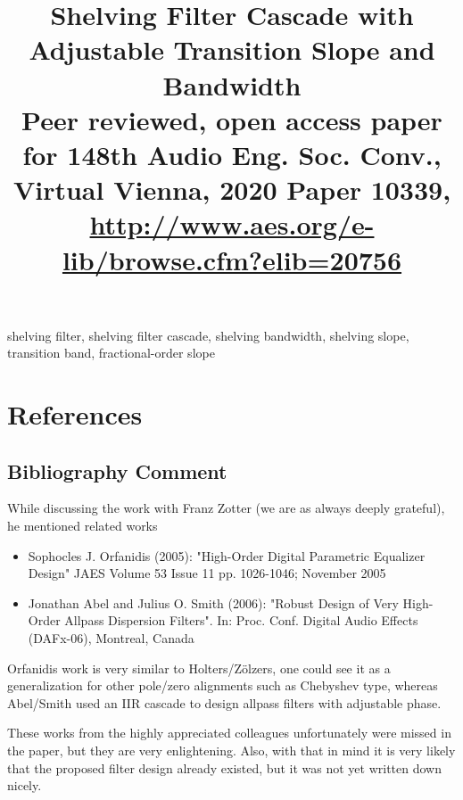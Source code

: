 \documentclass[conference]{IEEEtran}
\begin{document}
\title{Shelving Filter Cascade with Adjustable Transition Slope and Bandwidth\\
{\footnotesize Peer reviewed, open access paper for 148th
Audio Eng. Soc. Conv., Virtual Vienna, 2020
Paper 10339, \url{http://www.aes.org/e-lib/browse.cfm?elib=20756}}}
\author{
}
\maketitle
\thispagestyle{plain}
\pagestyle{plain}
\begin{abstract}

\end{abstract}
\begin{IEEEkeywords}
shelving filter,
shelving filter cascade,
shelving bandwidth,
shelving slope,
transition band,
fractional-order slope
\end{IEEEkeywords}

\renewcommand\refname{}
\section{References}



\subsection*{Bibliography Comment}
\noindent While discussing the work with Franz Zotter (we are as always
deeply grateful),
he mentioned related works
\begin{itemize}
\item Sophocles J. Orfanidis (2005):
"High-Order Digital Parametric Equalizer Design"
JAES Volume 53 Issue 11 pp. 1026-1046; November 2005
\item Jonathan Abel and Julius O. Smith (2006):
"Robust Design of Very High-Order Allpass Dispersion Filters". In:
Proc. Conf. Digital Audio Effects (DAFx-06), Montreal, Canada
\end{itemize}

\noindent Orfanidis work is very similar to Holters/Zölzers, one could see it as a
generalization for other pole/zero alignments such as Chebyshev type,
whereas Abel/Smith used an IIR cascade to design allpass filters with
adjustable phase.

These works from the highly appreciated colleagues unfortunately were missed
in the paper, but they are very enlightening. Also, with that in mind
it is very likely that the proposed filter design already existed,
but it was not yet written down nicely.
\end{document}
